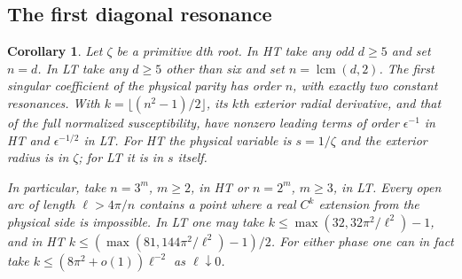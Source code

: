 \documentclass[11pt]{article}
\numberwithin{equation}{section}
\newtheorem{corollary}[theorem]{Corollary}
\theoremstyle{definition}
\begin{document}
\subsection{The first diagonal resonance}

\begin{corollary}\label{iso:prime-power-arcs}
Let $\zeta$ be a primitive $d$th root. In HT take any odd $d\ge5$
and set $n=d$. In LT take any $d\ge5$ other than six and set
$n=\operatorname{lcm}(d,2)$. The first singular coefficient of the
physical parity has order $n$, with exactly two constant resonances.
With $k=\lfloor(n^2-1)/2\rfloor$, its $k$th exterior radial derivative,
and that of the full normalized susceptibility, have
nonzero leading terms of order $\epsilon^{-1}$ in HT and
$\epsilon^{-1/2}$ in LT. For HT the physical variable is $s=1/\zeta$
and the exterior radius is in $\zeta$; for LT it is in $s$ itself.

In particular, take $n=3^m$, $m\ge2$, in HT or $n=2^m$, $m\ge3$,
in LT. Every open arc of length $\ell>4\pi/n$ contains a point
where a real $C^k$ extension from the physical side is impossible.
In LT one may take $k\le\max(32,32\pi^2/\ell^2)-1$, and in HT
$k\le(\max(81,144\pi^2/\ell^2)-1)/2$. For either phase one can
in fact take $k\le(8\pi^2+o(1))\ell^{-2}$ as $\ell\downarrow0$.
\end{corollary}
\end{document}

